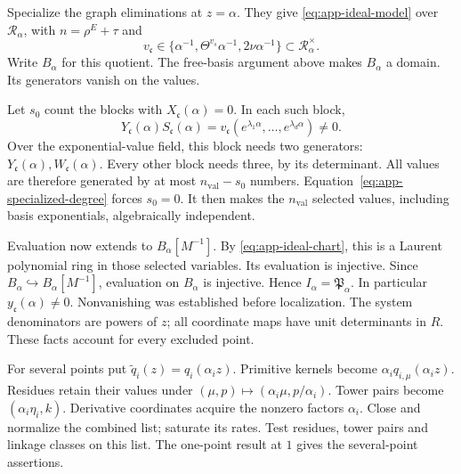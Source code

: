 Specialize the graph eliminations at $z=\alpha$.
They give \eqref{eq:app-ideal-model} over $\mathcal R_\alpha$, with
$n=\rho^E+\tau$ and
\[
 v_{\mathfrak c}\in
 \{\alpha^{-1},\Theta^{v_s}\alpha^{-1},2\nu\alpha^{-1}\}
 \subset \mathcal R_\alpha^\times.
\]
Write $B_\alpha$ for this quotient.
The free-basis argument above makes $B_\alpha$ a domain.
Its generators vanish on the values.

Let $s_0$ count the blocks with $X_{\mathfrak c}(\alpha)=0$.
In each such block,
\[
 Y_{\mathfrak c}(\alpha)S_{\mathfrak c}(\alpha)
   =v_{\mathfrak c}(e^{\lambda_1\alpha},\ldots,e^{\lambda_d\alpha})
   \ne0.
\]
Over the exponential-value field, this block needs two generators:
$Y_{\mathfrak c}(\alpha),W_{\mathfrak c}(\alpha)$.
Every other block needs three, by its determinant.
All values are therefore generated by at most $n_{\mathrm{val}}-s_0$ numbers.
Equation~\eqref{eq:app-specialized-degree} forces $s_0=0$.
It then makes the $n_{\mathrm{val}}$ selected values, including basis exponentials,
algebraically independent.

Evaluation now extends to $B_\alpha[M^{-1}]$.
By \eqref{eq:app-ideal-chart}, this is a Laurent polynomial ring
in those selected variables. Its evaluation is injective.
Since $B_\alpha\hookrightarrow B_\alpha[M^{-1}]$, evaluation on
$B_\alpha$ is injective. Hence $I_\alpha=\mathfrak P_\alpha$.
In particular $y_{\mathfrak c}(\alpha)\ne0$.
Nonvanishing was established before localization.
The system denominators are powers of $z$; all coordinate maps have
unit determinants in $R$. These facts account for every excluded point.

For several points put $\widetilde q_i(z)=q_i(\alpha_i z)$.
Primitive kernels become $\alpha_iq_{i,\mu}(\alpha_i z)$.
Residues retain their values under
$(\mu,p)\mapsto(\alpha_i\mu,p/\alpha_i)$.
Tower pairs become $(\alpha_i\eta_i,k)$.
Derivative coordinates acquire the nonzero factors $\alpha_i$.
Close and normalize the combined list; saturate its rates.
Test residues, tower pairs and linkage classes on this list.
The one-point result at $1$ gives the several-point assertions.

